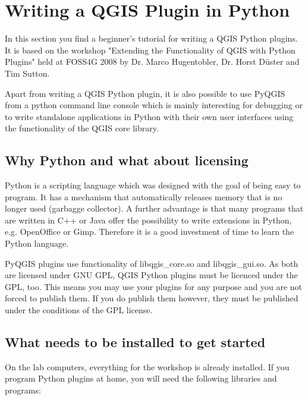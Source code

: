 
\section{Writing a QGIS Plugin in Python}


In this section you find a beginner's tutorial for writing a QGIS Python
plugins. It is based on the workshop "Extending the Functionality of QGIS
with Python Plugins" held at FOSS4G 2008 by Dr. Marco Hugentobler, Dr. Horst
D\"uster and Tim Sutton. 

Apart from writing a QGIS Python plugin, it is also possible to use PyQGIS
from a python command line console which is mainly interesting for debugging
or to write standalone applications in Python with their own user interfaces
using the functionality of the QGIS core library.

\subsection{Why Python and what about licensing}

Python is a scripting language which was designed with the goal of being easy
to program. It has a mechanism that automatically releases memory that is no
longer used (garbagge collector). A further advantage is that many programs
that are written in C++ or Java offer the possibility to write extensions in
Python, e.g. OpenOffice or Gimp. Therefore it is a good investment of time to
learn the Python language.

PyQGIS plugins use functionality of libqgis\_core.so and libqgis\_gui.so. As
both are licensed under GNU GPL, QGIS Python plugins must be licenced under the
GPL, too. This means you may use your plugins for any purpose and you are not
forced to publish them. If you do publish them however, they must be
published under the conditions of the GPL license. 

\subsection{What needs to be installed to get started}

On the lab computers, everything for the workshop is already installed. If
you program Python plugins at home, you will need the following libraries and
programs:

